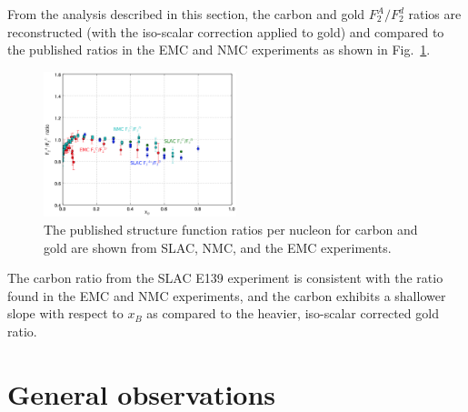 \documentclass[oneside]{article}
\begin{document}
From the analysis described in this section, the carbon and gold $F_2^A/F_2^d$ ratios are reconstructed (with the iso-scalar correction applied to gold) and compared to the published ratios in the EMC and NMC experiments as shown in Fig.~\ref{fig:emc_ratios}.

\begin{figure}[H]
  \centering
      	  \includegraphics[width=0.5\textwidth]{plots/emc_ratios_data.png}
 	 \caption[EMC ratios for various data]{The published structure function ratios per nucleon for carbon and gold are shown from SLAC, NMC, and the EMC experiments.}
  \label{fig:emc_ratios}
 \end{figure}
 
 The carbon ratio from the SLAC E139 experiment is consistent with the ratio found in the EMC and NMC experiments, and the carbon exhibits a shallower slope with respect to $x_B$ as compared to the heavier, iso-scalar corrected gold ratio. 

\section{General observations}
 
\end{document}
